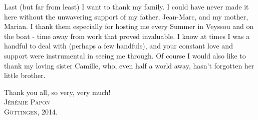 Last (but far from least) I want to thank my family. I could have never made it here without the unwavering support of my father, Jean-Marc, and my mother, Marian. I thank them especially for hosting me every Summer in Veyssou and on the boat - time away from work that proved invaluable. I know at times I was a handful to deal with (perhaps a few handfuls), and your constant love and support were instrumental in seeing me through. Of course I would also like to thank my loving sister Camille, who, even half a world away, hasn't forgotten her little brother.
\begin{flushright}
Thank you all, so very, very much! \\
\vspace{10pt}
\textsc{J\'er\'emie Papon} \\
\textsc{G\"ottingen, 2014.}
\end{flushright}

